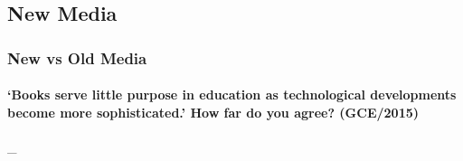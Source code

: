 \documentclass[../../main]{subfiles}
\begin{document}
\subsection{New Media}

\subsubsection{New vs Old Media}

\paragraph{`Books serve little purpose in education as technological developments become more sophisticated.' How far do you agree? (GCE/2015)} \_
\end{document}
